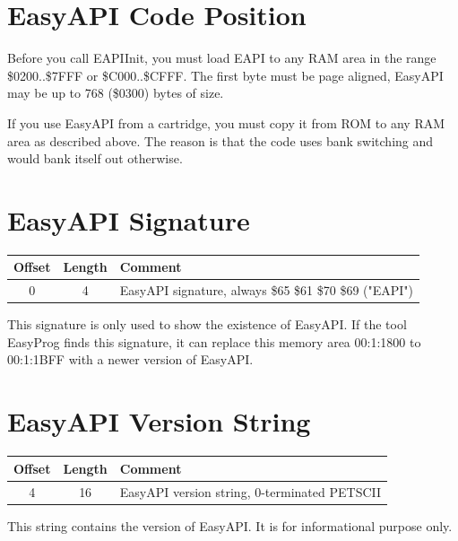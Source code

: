 \documentclass[a4paper,oneside]{memoir}
\begin{document}
\section{EasyAPI Code Position}

Before you call EAPIInit, you must load EAPI to any RAM area in the range
\$0200..\$7FFF or \$C000..\$CFFF. The first byte must be page aligned, EasyAPI
may be up to 768 (\$0300) bytes of size.

If you use EasyAPI from a cartridge, you must copy it from ROM to any RAM area
as described above. The reason is that the code uses bank switching and would
bank itself out otherwise.

\section{EasyAPI Signature}

\begin{table}[!htbp]
    \centering
    \begin{tabularx}{\textwidth}{ ccX }
        \toprule
        Offset & Length & Comment \\
        \midrule
        0   &   4   &   EasyAPI signature, always \$65 \$61 \$70 \$69 ("EAPI") \\[3pt]
        \bottomrule
    \end{tabularx}
\end{table}

This signature is only used to show the existence of EasyAPI. If the tool
EasyProg finds this signature, it can replace this memory area 00:1:1800 to
00:1:1BFF with a newer version of EasyAPI.

\section{EasyAPI Version String}

\begin{table}[!htbp]
    \centering
    \begin{tabularx}{\textwidth}{ ccX }
        \toprule
        Offset & Length & Comment \\
        \midrule
        4   &   16  &   EasyAPI version string, 0-terminated PETSCII \\[3pt]
        \bottomrule
    \end{tabularx}
\end{table}

This string contains the version of EasyAPI. It is for informational purpose only.
\end{document}
